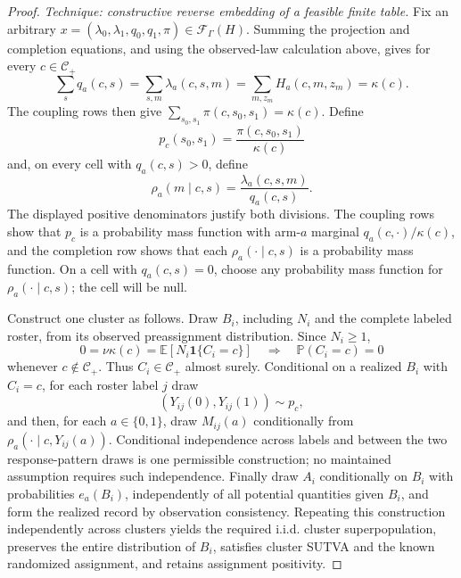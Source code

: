 \documentclass{article}
\begin{document}
\begin{proof}
\emph{Technique: constructive reverse embedding of a feasible finite table.}
Fix an arbitrary \(x=(\lambda_0,\lambda_1,q_0,q_1,\pi)\in\mathcal F_{\Gamma}(H)\).  Summing the projection and completion equations, and using the observed-law calculation above, gives for every \(c\in\mathcal C_+\)
\[
\sum_s q_a(c,s)
=\sum_{s,m}\lambda_a(c,s,m)
=\sum_{m,z_m}H_a(c,m,z_m)
=\kappa(c).
\]
The coupling rows then give \(\sum_{s_0,s_1}\pi(c,s_0,s_1)=\kappa(c)\).  Define
\[
p_c(s_0,s_1)=\frac{\pi(c,s_0,s_1)}{\kappa(c)}
\]
and, on every cell with \(q_a(c,s)>0\), define
\[
\rho_a(m\mid c,s)=\frac{\lambda_a(c,s,m)}{q_a(c,s)}.
\]
The displayed positive denominators justify both divisions.  The coupling rows show that \(p_c\) is a probability mass function with arm-\(a\) marginal \(q_a(c,\cdot)/\kappa(c)\), and the completion row shows that each \(\rho_a(\cdot\mid c,s)\) is a probability mass function.  On a cell with \(q_a(c,s)=0\), choose any probability mass function for \(\rho_a(\cdot\mid c,s)\); the cell will be null.

Construct one cluster as follows.  Draw \(B_i\), including \(N_i\) and the complete labeled roster, from its observed preassignment distribution.  Since \(N_i\geq1\),
\[
0=\nu\kappa(c)=\mathbb E[N_i\mathbf 1\{C_i=c\}]
\quad\Longrightarrow\quad
\mathbb P(C_i=c)=0
\]
whenever \(c\notin\mathcal C_+\).  Thus \(C_i\in\mathcal C_+\) almost surely.  Conditional on a realized \(B_i\) with \(C_i=c\), for each roster label \(j\) draw
\[
(Y_{ij}(0),Y_{ij}(1))\sim p_c,
\]
and then, for each \(a\in\{0,1\}\), draw \(M_{ij}(a)\) conditionally from \(\rho_a(\cdot\mid c,Y_{ij}(a))\).  Conditional independence across labels and between the two response-pattern draws is one permissible construction; no maintained assumption requires such independence.  Finally draw \(A_i\) conditionally on \(B_i\) with probabilities \(e_a(B_i)\), independently of all potential quantities given \(B_i\), and form the realized record by observation consistency.  Repeating this construction independently across clusters yields the required i.i.d. cluster superpopulation, preserves the entire distribution of \(B_i\), satisfies cluster SUTVA and the known randomized assignment, and retains assignment positivity.


\end{proof}
\end{document}
